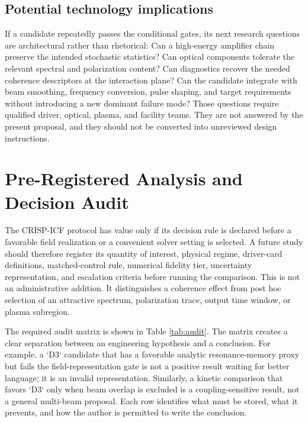 \documentclass[conference]{../../../../Conference-LaTeX-template_10-17-19/IEEEtran}
\begin{document}
\subsection{Potential technology implications}
If a candidate repeatedly passes the conditional gates, its next research questions are architectural rather than rhetorical: Can a high-energy amplifier chain preserve the intended stochastic statistics? Can optical components tolerate the relevant spectral and polarization content? Can diagnostics recover the needed coherence descriptors at the interaction plane? Can the candidate integrate with beam smoothing, frequency conversion, pulse shaping, and target requirements without introducing a new dominant failure mode? Those questions require qualified driver, optical, plasma, and facility teams. They are not answered by the present proposal, and they should not be converted into unreviewed design instructions.

\section{Pre-Registered Analysis and Decision Audit}
The CRISP-ICF protocol has value only if its decision rule is declared before a favorable field realization or a convenient solver setting is selected. A future study should therefore register its quantity of interest, physical regime, driver-card definitions, matched-control rule, numerical fidelity tier, uncertainty representation, and escalation criteria before running the comparison. This is not an administrative addition. It distinguishes a coherence effect from post hoc selection of an attractive spectrum, polarization trace, output time window, or plasma subregion.

The required audit matrix is shown in Table \ref{tab:audit}. The matrix creates a clear separation between an engineering hypothesis and a conclusion. For example, a `D3` candidate that has a favorable analytic resonance-memory proxy but fails the field-representation gate is not a positive result waiting for better language; it is an invalid representation. Similarly, a kinetic comparison that favors `D3` only when beam overlap is excluded is a coupling-sensitive result, not a general multi-beam proposal. Each row identifies what must be stored, what it prevents, and how the author is permitted to write the conclusion.
\end{document}
